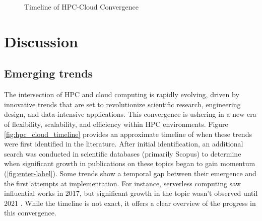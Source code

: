 \begin{figure}[]
      \centering
      \resizebox{0.9\textwidth}{!}{  }
      \caption{Timeline of HPC-Cloud Convergence}
      \label{fig:hpc_cloud_timeline}
    \end{figure}

\section{Discussion}

\subsection{Emerging trends}
\label{subsec:emerging_trends}


    The intersection of HPC and cloud computing is rapidly evolving, driven by innovative trends that are set to revolutionize scientific research, engineering design, and data-intensive applications. This convergence is ushering in a new era of flexibility, scalability, and efficiency within HPC environments. Figure \autoref{fig:hpc_cloud_timeline} provides an approximate timeline of when these trends were first identified in the literature. After initial identification, an additional search was conducted in scientific databases (primarily Scopus) to determine when significant growth in publications on these topics began to gain momentum (\autoref{fig:enter-label}). Some trends show a temporal gap between their emergence and the first attempts at implementation. For instance, serverless computing saw influential works in 2017, but significant growth in the topic wasn't observed until 2021 \cite{van2017spec}. While the timeline is not exact, it offers a clear overview of the progress in this convergence.

